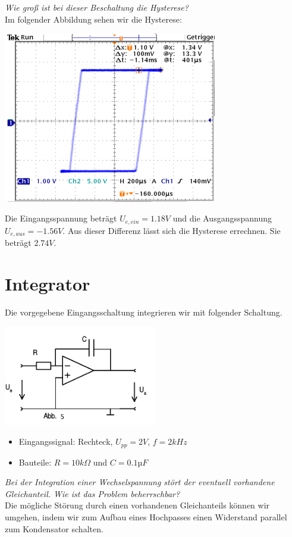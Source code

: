 \documentclass[11pt,a4paper,titlepage]{article}
\begin{document}
\textit{Wie gro\ss{} ist bei dieser Beschaltung die Hysterese?} \\[2ex]
Im folgender Abbildung sehen wir die Hysterese:
\begin{center}
\includegraphics[width=0.7\textwidth]{11}
\end{center}
Die Eingangsspannung betr\"agt $U_{e,ein}=1.18V$ und die Ausgangsspannung $U_{e,aus}=-1.56V$. Aus dieser Differenz l\"asst sich die Hysterese errechnen. Sie betr\"agt $2.74V$.

\newpage

\section{Integrator}
Die vorgegebene Eingangsschaltung integrieren wir mit folgender Schaltung.
\begin{center}
\includegraphics[width=0.5\textwidth]{schalt-4}
\end{center}
\begin{itemize}
\item[] Eingangssignal: Rechteck, $U_{pp}=2V$, $f=2kHz$
\item[] Bauteile: $R=10k\Omega$ und $C=0.1µF$
\end{itemize}
\textit{Bei der Integration einer Wechselspannung st\"ort der eventuell vorhandene Gleichanteil. Wie ist das Problem beherrschbar?} \\[1ex]
Die m\"ogliche St\"orung durch einen vorhandenen Gleichanteils k\"onnen wir umgehen, indem wir zum Aufbau eines Hochpasses einen Widerstand parallel zum Kondensator schalten.
\end{document}
